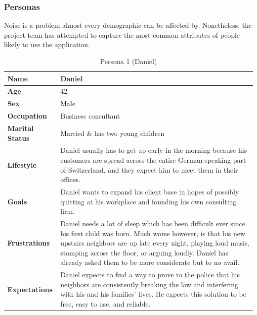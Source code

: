 \subsubsection{Personas}\label{subsubsec:personas}
Noise is a problem almost every demographic can be affected by.
Nonetheless, the project team has attempted to capture the most common attributes of people likely to use the application. \\
\begin{table}[H]
    \centering
    \begin{tabularx}{\textwidth}{l X}
        \toprule
        \textbf{Name}           & Daniel                                                                                                                      \\
        \midrule
        \textbf{Age}            & 42                                                                                                                          \\
        \midrule
        \textbf{Sex}            & Male                                                                                                                        \\
        \midrule
        \textbf{Occupation}     & Business consultant                                                                                                         \\
        \midrule
        \textbf{Marital Status} & Married \& has two young children                                                                                           \\
        \midrule
        \textbf{Lifestyle}      & Daniel usually has to get up early in the morning because his
        customers are spread across the entire German-speaking part of Switzerland, and they expect him to meet them in their offices.                        \\
        \midrule
        \textbf{Goals}          & Daniel wants to expand his client base in hopes of possibly quitting at his workplace and founding his own consulting firm. \\
        \midrule
        \textbf{Frustrations}   & Daniel needs a lot of sleep which has been difficult ever since his first child was born.
        Much worse however, is that his new upstairs neighbors are up late every night, playing loud music,
        stomping across the floor, or arguing loudly. Daniel has already asked them to be more considerate but to no avail.                                   \\
        \midrule
        \textbf{Expectations}   & Daniel expects to find a way to prove to the police that his neighbors are consistently
        breaking the law and interfering with his and his families' lives. He expects this solution to be free, easy to use, and reliable.                    \\
        \bottomrule
    \end{tabularx}
    \caption{Persona 1 (Daniel)}\label{table:persona1}
\end{table}

